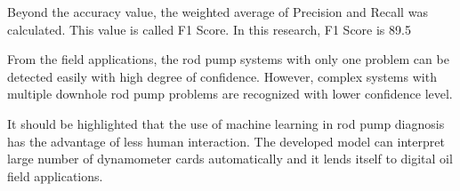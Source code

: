 Beyond the accuracy value, the weighted average of Precision and Recall was calculated. This value is called F1 Score. In this research, F1 Score is 89.5%

From the field applications, the rod pump systems with only one problem can be detected easily with high degree of confidence. However, complex systems with multiple downhole rod pump problems are recognized with lower confidence level.

It should be highlighted that the use of machine learning in rod pump diagnosis has the advantage of less human interaction. The developed model can interpret large number of dynamometer cards automatically and it lends itself to digital oil field applications.